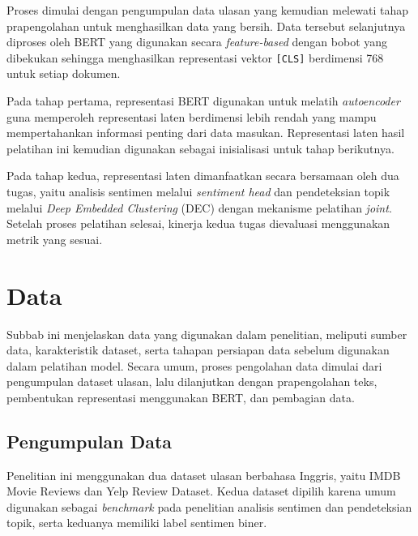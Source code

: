 Proses dimulai dengan pengumpulan data ulasan yang kemudian melewati tahap prapengolahan 
untuk menghasilkan data yang bersih. Data tersebut selanjutnya diproses oleh BERT yang 
digunakan secara \textit{feature-based} dengan bobot yang dibekukan sehingga menghasilkan 
representasi vektor \texttt{[CLS]} berdimensi 768 untuk setiap dokumen.

Pada tahap pertama, representasi BERT digunakan untuk melatih \textit{autoencoder} guna 
memperoleh representasi laten berdimensi lebih rendah yang mampu mempertahankan informasi 
penting dari data masukan. Representasi laten hasil pelatihan ini kemudian digunakan sebagai 
inisialisasi untuk tahap berikutnya.

Pada tahap kedua, representasi laten dimanfaatkan secara bersamaan oleh dua tugas, 
yaitu analisis sentimen melalui \textit{sentiment head} dan pendeteksian topik 
melalui \textit{Deep Embedded Clustering} (DEC) dengan mekanisme
pelatihan \textit{joint}.
Setelah proses pelatihan selesai, kinerja kedua tugas dievaluasi menggunakan metrik yang sesuai.


\section{Data}

Subbab ini menjelaskan data yang digunakan dalam penelitian, meliputi sumber
data, karakteristik dataset, serta tahapan persiapan data sebelum digunakan
dalam pelatihan model. Secara umum, proses pengolahan data dimulai dari
pengumpulan dataset ulasan, lalu dilanjutkan dengan prapengolahan teks,
pembentukan representasi menggunakan BERT, dan pembagian data.

\subsection{Pengumpulan Data}

Penelitian ini menggunakan dua dataset ulasan berbahasa Inggris, yaitu IMDB
Movie Reviews dan Yelp Review Dataset. Kedua dataset dipilih karena umum
digunakan sebagai \textit{benchmark} pada penelitian analisis sentimen dan
pendeteksian topik, serta keduanya memiliki label sentimen biner.

